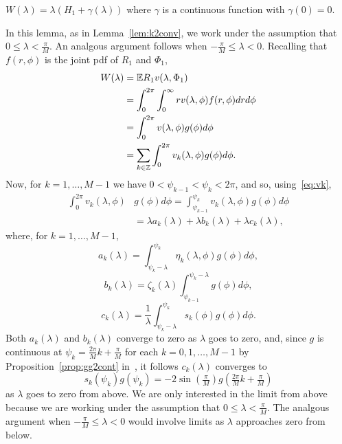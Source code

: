\documentclass[journal]{IEEEtran}
\begin{document}
\begin{lemma}\label{lem:expRvlamphi}
$W(\lambda) =  \lambda(H_1 + \gamma(\lambda))$ where $\gamma$ is a continuous function with $\gamma(0) = 0$.
\end{lemma}
\begin{IEEEproof}
In this lemma, as in Lemma~\ref{lem:k2conv}, we work under the assumption that $0 \leq \lambda < \frac{\pi}{M}$.  An analgous argument follows when $-\tfrac{\pi}{M} \leq \lambda < 0$.  Recalling that $f(r,\phi)$ is the joint pdf of $R_1$ and $\Phi_1$, 
\begin{align}
W(\lambda) &= {\mathbb E} R_1 v(\lambda, \Phi_1) \nonumber  \\
&= \int_0^{2\pi}\int_{0}^\infty r v(\lambda, \phi) f(r,\phi) dr d\phi \nonumber  \\ 
&= \int_0^{2\pi} v(\lambda, \phi) g(\phi) d\phi \nonumber \\
&= \sum_{k \in {\mathbb Z}} \int_0^{2\pi} v_k(\lambda, \phi) g(\phi) d\phi. \label{eq:Winfsum}
\end{align}
Now, for $k = 1, \dots, M-1$ we have $0 < \psi_{k-1} < \psi_k < 2\pi$, and so, using~\eqref{eq:vk},
\begin{align*}
\int_0^{2\pi} v_k(\lambda, \phi) &g(\phi) d\phi = \int_{\psi_{k-1}}^{\psi_{k}} v_k(\lambda, \phi) g(\phi) d\phi \\
&= \lambda a_k(\lambda) + \lambda b_k(\lambda) + \lambda c_k(\lambda),
\end{align*}
where, for $k = 1, \dots, M-1$,
\begin{equation}\label{eq:ak}
a_k(\lambda) = \int_{\psi_k-\lambda}^{\psi_k}\eta_k(\lambda, \phi) g(\phi) d\phi,
\end{equation}
\[
b_k(\lambda) = \zeta_k(\lambda) \int_{\psi_{k-1}}^{\psi_k -\lambda}g(\phi) d\phi,
\]
\begin{equation}\label{eq:ck}
c_k(\lambda) = \frac{1}{\lambda} \int_{\psi_{k} - \lambda}^{\psi_{k}} s_k(\phi) g(\phi) d\phi.
\end{equation}
Both $a_k(\lambda)$ and $b_k(\lambda)$ converge to zero as $\lambda$ goes to zero, and, since $g$ is continuous at $\psi_k = \tfrac{2\pi}{M}k + \tfrac{\pi}{M}$ for each $k = 0, 1, \dots, M-1$ by Proposition~\ref{prop:gg2cont} in~\cite{McKilliam_leastsqPSKpilotsdata_2012}, it follows $c_k(\lambda)$ converges to 
\[
s_k(\psi_k)g(\psi_k) = -2\sin(\tfrac{\pi}{M}) g(\tfrac{2\pi}{M}k + \tfrac{\pi}{M})
\]
as $\lambda$ goes to zero from above.  We are only interested in the limit from above because we are working under the assumption that $0 \leq \lambda < \frac{\pi}{M}$.  The analgous argument when $-\tfrac{\pi}{M} \leq \lambda < 0$ would involve limits as $\lambda$ approaches zero from below.


\end{IEEEproof}
\end{document}
